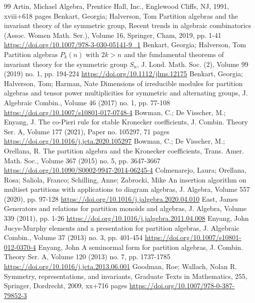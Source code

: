 \documentclass[10pt]{amsart}
\theoremstyle{definition}
\theoremstyle{definition}
\theoremstyle{plain}
\theoremstyle{remark}
\theoremstyle{plain}
\theoremstyle{plain}
\begin{document}
\begin{thebibliography}{99}
 Artin, Michael Algebra, Prentice Hall, Inc., Englewood Cliffs, NJ, 1991, xviii+618 pages
 Benkart, Georgia; Halverson, Tom Partition algebras and the invariant theory of the symmetric group, Recent trends in algebraic combinatorics (Assoc. Women Math. Ser.), Volume 16, Springer, Cham, 2019, pp. 1-41 \url{https://doi.org/10.1007/978-3-030-05141-9_1}
 Benkart, Georgia; Halverson, Tom Partition algebras ${P}_k(n)$ with $2k>n$ and the fundamental theorems of invariant theory for the symmetric group ${S}_n$, J. Lond. Math. Soc. (2), Volume 99 (2019) no. 1, pp. 194-224 \url{https://doi.org/10.1112/jlms.12175}
 Benkart, Georgia; Halverson, Tom; Harman, Nate Dimensions of irreducible modules for partition algebras and tensor power multiplicities for symmetric and alternating groups, J. Algebraic Combin., Volume 46 (2017) no. 1, pp. 77-108 \url{https://doi.org/10.1007/s10801-017-0748-4}
 Bowman, C.; De Visscher, M.; Enyang, J. The co-Pieri rule for stable Kronecker coefficients, J. Combin. Theory Ser. A, Volume 177 (2021), Paper no. 105297, 71 pages \url{https://doi.org/10.1016/j.jcta.2020.105297}
 Bowman, C.; De Visscher, M.; Orellana, R. The partition algebra and the Kronecker coefficients, Trans. Amer. Math. Soc., Volume 367 (2015) no. 5, pp. 3647-3667 \url{https://doi.org/10.1090/S0002-9947-2014-06245-4}
 Colmenarejo, Laura; Orellana, Rosa; Saliola, Franco; Schilling, Anne; Zabrocki, Mike An insertion algorithm on multiset partitions with applications to diagram algebras, J. Algebra, Volume 557 (2020), pp. 97-128 \url{https://doi.org/10.1016/j.jalgebra.2020.04.010}
 East, James Generators and relations for partition monoids and algebras, J. Algebra, Volume 339 (2011), pp. 1-26 \url{https://doi.org/10.1016/j.jalgebra.2011.04.008}
 Enyang, John Jucys-Murphy elements and a presentation for partition algebras, J. Algebraic Combin., Volume 37 (2013) no. 3, pp. 401-454 \url{https://doi.org/10.1007/s10801-012-0370-4}
 Enyang, John A seminormal form for partition algebras, J. Combin. Theory Ser. A, Volume 120 (2013) no. 7, pp. 1737-1785 \url{https://doi.org/10.1016/j.jcta.2013.06.001}
 Goodman, Roe; Wallach, Nolan R. Symmetry, representations, and invariants, Graduate Texts in Mathematics, 255, Springer, Dordrecht, 2009, xx+716 pages \url{https://doi.org/10.1007/978-0-387-79852-3}

\end{thebibliography}
\end{document}
